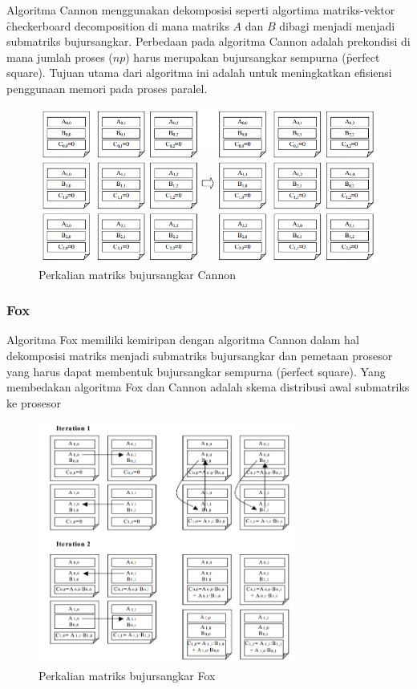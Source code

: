 Algoritma Cannon menggunakan dekomposisi seperti algortima matriks-vektor \f{checkerboard decomposition} di mana matriks $A$ dan $B$ dibagi menjadi menjadi submatriks bujursangkar. Perbedaan pada algoritma Cannon adalah prekondisi di mana jumlah proses ($np$) harus merupakan bujursangkar sempurna (\f{perfect square}). Tujuan utama dari algoritma ini adalah untuk meningkatkan efisiensi penggunaan memori pada proses paralel.

\begin{figure}
	\centering
	\includegraphics[width=1\textwidth]
	{pics/mm_cannon}
	\caption{Perkalian matriks bujursangkar Cannon}
	\label{fig:mm_cannon}
\end{figure}

\subsubsection{Fox}

Algoritma Fox memiliki kemiripan dengan algoritma Cannon dalam hal dekomposisi matriks menjadi submatriks bujursangkar dan pemetaan prosesor yang harus dapat membentuk bujursangkar sempurna (\f{perfect square}). Yang membedakan algoritma Fox dan Cannon adalah skema distribusi awal submatriks ke prosesor

\begin{figure}
	\centering
	\includegraphics[width=0.75\textwidth]
	{pics/mm_fox}
	\caption{Perkalian matriks bujursangkar Fox}
	\label{fig:mm_fox}
\end{figure}

